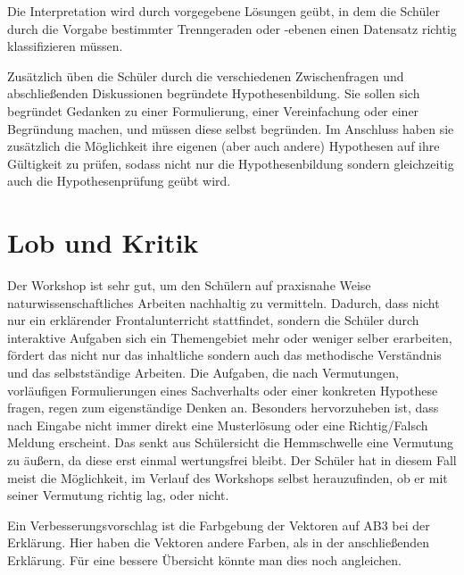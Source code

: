             Die Interpretation wird durch vorgegebene Lösungen geübt, in dem die Schüler durch die Vorgabe bestimmter Trenngeraden oder -ebenen einen Datensatz richtig klassifizieren müssen.\\
            \par
       Zusätzlich üben die Schüler durch die verschiedenen Zwischenfragen und abschließenden Diskussionen begründete Hypothesenbildung.
       Sie sollen sich begründet Gedanken zu einer Formulierung, einer Vereinfachung oder einer Begründung machen, und müssen diese selbst begründen.
       Im Anschluss haben sie zusätzlich die Möglichkeit ihre eigenen (aber auch andere) Hypothesen auf ihre Gültigkeit zu prüfen, sodass nicht nur die Hypothesenbildung sondern gleichzeitig auch die Hypothesenprüfung geübt wird.

 \section{Lob und Kritik}
        Der Workshop ist sehr gut, um den Schülern auf praxisnahe Weise naturwissenschaftliches Arbeiten nachhaltig zu vermitteln.
        Dadurch, dass nicht nur ein erklärender Frontalunterricht stattfindet, sondern die Schüler durch interaktive Aufgaben sich ein Themengebiet mehr oder weniger selber erarbeiten, fördert das nicht nur das inhaltliche sondern auch das methodische Verständnis und das selbstständige Arbeiten.
        Die Aufgaben, die nach Vermutungen, vorläufigen Formulierungen eines Sachverhalts oder einer konkreten Hypothese fragen, regen zum eigenständige Denken an.
        Besonders hervorzuheben ist, dass nach Eingabe nicht immer direkt eine Musterlösung oder eine Richtig/Falsch Meldung erscheint.
        Das senkt aus Schülersicht die Hemmschwelle eine Vermutung zu äußern, da diese erst einmal wertungsfrei bleibt. Der Schüler hat in diesem Fall meist die Möglichkeit, im Verlauf des Workshops selbst herauzufinden, ob er mit seiner Vermutung richtig lag, oder nicht.

        \par

        Ein Verbesserungsvorschlag ist die Farbgebung der Vektoren auf AB3 bei der Erklärung. Hier haben die Vektoren andere Farben, als in der anschließenden Erklärung. Für eine bessere Übersicht könnte man dies noch angleichen.

